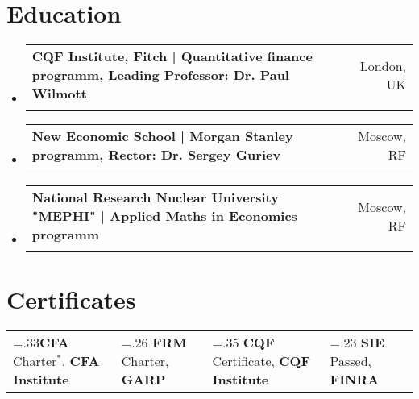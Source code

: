 \documentclass[letterpaper,hidelinks]{article}
\makeatletter
\newcommand{\resumeSubheading}[4]{
  \vspace{-2pt}\item
    \begin{tabular*}{0.97\textwidth}[t]{l@{\extracolsep{\fill}}r}
      \textbf{#1} & #2 \\
      \text{\small#3} & \text{\small #4} \\
    \end{tabular*}\vspace{-7pt}
}
\newcommand{\resumeSubHeadingListStart}{\begin{itemize}[leftmargin=0.1in, label={}]}
\newcommand{\resumeSubHeadingListEnd}{\end{itemize}}
\makeatother
\begin{document}
\vspace{-10pt}
\section{Education}
\vspace{1pt}
\resumeSubHeadingListStart
\resumeSubheading
{{CQF Institute, Fitch | Quantitative finance programm, Leading Professor: Dr. Paul Wilmott}}{London, UK\vspace{-2pt}}
{Quantitative Finance Charter}{Jan 2022 \textbf{--} Jul 2022\vspace{4pt}}
\resumeSubheading
{{New Economic School | Morgan Stanley programm, Rector: Dr. Sergey Guriev}}{Moscow, RF\vspace{-2pt}}
{Masters in Finance}{Sep 2013 \textbf{--} Jul 2015\vspace{4pt}}
\resumeSubheading
{{National Research Nuclear University "MEPHI" | Applied Maths in Economics programm}}{Moscow, RF\vspace{-2pt}}
{Economist Mathematician}{Sep 2007 \textbf{--} Jul 2012}
\resumeSubHeadingListEnd

\vspace{-4pt}
\section{Certificates}
\resumeSubHeadingListStart
\small{\item{
  \begin{tabularx}{0.96\textwidth} { 
     >{\centering\arraybackslash\hsize=.33\hsize}X 
    || >{\centering\arraybackslash\hsize=.26\hsize}X 
    || >{\centering\arraybackslash\hsize=.35\hsize}X  
    || >{\centering\arraybackslash\hsize=.23\hsize}X } 
    \textbf{CFA} Charter$\mathbb{}^\ast$, \textbf{CFA Institute} & 
    \textbf{FRM} Charter, \textbf{GARP} & 
    \textbf{CQF} Certificate, \textbf{CQF Institute} & 
    \textbf{SIE} Passed, \textbf{FINRA}
  \end{tabularx}
}}
\resumeSubHeadingListEnd
\end{document}
